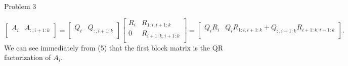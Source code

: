 \begin{problem}{Problem 3}
\begin{Highlight}[Solution]
        \begin{equation}
            \begin{bmatrix}
                A_{i} & A_{:,i+1:k} \\
            \end{bmatrix}
            = 
            \begin{bmatrix}
                Q_{i} & Q_{:,i+1:k} \\
            \end{bmatrix}
            \begin{bmatrix}
                R_{i} & R_{1:i,i+1:k} \\
                0 & R_{i+1:k,i+1:k} \\
            \end{bmatrix}
            = 
            \begin{bmatrix}
                Q_{i}R_{i} & Q_{i}R_{1:i,i+1:k} + Q_{:,i+1:k}R_{i+1:k,i+1:k} \\
            \end{bmatrix}.
        \end{equation}
        We can see immediately from (5) that the first block matrix is the QR factorization of $A_{i}$.
    \end{Highlight}
\end{problem}

